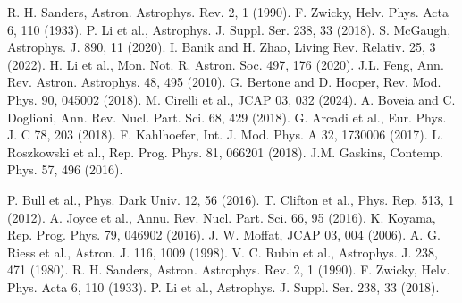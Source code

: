 \documentclass[twocolumn,prd,amsmath,amssymb,aps,superscriptaddress,nofootinbib]{revtex4-2}
\begin{document}
\begin{thebibliography}{50}
 R. H. Sanders, Astron. Astrophys. Rev. 2, 1 (1990).
 F. Zwicky, Helv. Phys. Acta 6, 110 (1933).
 P. Li et al., Astrophys. J. Suppl. Ser. 238, 33 (2018).
 S. McGaugh, Astrophys. J. 890, 11 (2020).
 I. Banik and H. Zhao, Living Rev. Relativ. 25, 3 (2022).
 H. Li et al., Mon. Not. R. Astron. Soc. 497, 176 (2020).
 J.L. Feng, Ann. Rev. Astron. Astrophys. 48, 495 (2010).
 G. Bertone and D. Hooper, Rev. Mod. Phys. 90, 045002 (2018).
 M. Cirelli et al., JCAP 03, 032 (2024).
 A. Boveia and C. Doglioni, Ann. Rev. Nucl. Part. Sci. 68, 429 (2018).
 G. Arcadi et al., Eur. Phys. J. C 78, 203 (2018).
 F. Kahlhoefer, Int. J. Mod. Phys. A 32, 1730006 (2017).
 L. Roszkowski et al., Rep. Prog. Phys. 81, 066201 (2018).
 J.M. Gaskins, Contemp. Phys. 57, 496 (2016).

 P. Bull et al., Phys. Dark Univ. 12, 56 (2016).
 T. Clifton et al., Phys. Rep. 513, 1 (2012).
 A. Joyce et al., Annu. Rev. Nucl. Part. Sci. 66, 95 (2016).
 K. Koyama, Rep. Prog. Phys. 79, 046902 (2016).
 J. W. Moffat, JCAP 03, 004 (2006).
 A. G. Riess et al., Astron. J. 116, 1009 (1998).
 V. C. Rubin et al., Astrophys. J. 238, 471 (1980).
 R. H. Sanders, Astron. Astrophys. Rev. 2, 1 (1990).
 F. Zwicky, Helv. Phys. Acta 6, 110 (1933).
 P. Li et al., Astrophys. J. Suppl. Ser. 238, 33 (2018).
\end{thebibliography}
\end{document}
